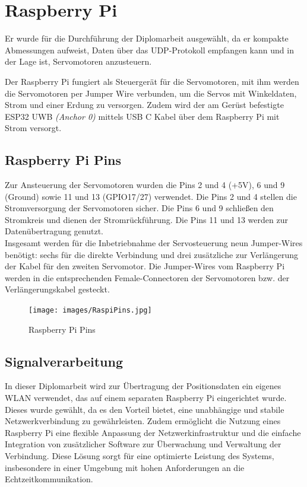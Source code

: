 \section{Raspberry Pi}
Er wurde für die Durchführung der Diplomarbeit ausgewählt, da er kompakte Abmessungen aufweist, Daten über das UDP-Protokoll empfangen kann und in der Lage ist, Servomotoren anzusteuern.

Der Raspberry Pi fungiert als Steuergerät für die Servomotoren, mit ihm werden die Servomotoren per Jumper Wire verbunden, um die Servos mit Winkeldaten, Strom und einer Erdung zu versorgen. Zudem wird der am Gerüst befestigte ESP32 UWB \textit{(Anchor 0)} mittels USB C Kabel über dem Raspberry Pi mit Strom versorgt. 

\newpage
\subsection{Raspberry Pi Pins}
Zur Ansteuerung der Servomotoren wurden die Pins 2 und 4 (+5V), 6 und 9 (Ground) sowie 11 und 13 (GPIO17/27) verwendet. Die Pins 2 und 4 stellen die Stromversorgung der Servomotoren sicher. Die Pins 6 und 9 schließen den Stromkreis und dienen der Stromrückführung. Die Pins 11 und 13 werden zur Datenübertragung genutzt.\\
Insgesamt werden für die Inbetriebnahme der Servosteuerung neun Jumper-Wires benötigt: sechs für die direkte Verbindung und drei zusätzliche zur Verlängerung der Kabel für den zweiten Servomotor. Die Jumper-Wires vom Raspberry Pi werden in die entsprechenden Female-Connectoren der Servomotoren bzw. der Verlängerungskabel gesteckt.

\begin{figure}[H]
	\centering
	\texttt{[image: images/RaspiPins.jpg]}
	\caption[Raspberry Pi Pins]{Raspberry Pi Pins}
	\label{fig: Raspberry Pi Pins}
\end{figure}


\subsection{Signalverarbeitung}
In dieser Diplomarbeit wird zur Übertragung der Positionsdaten ein eigenes WLAN verwendet, das auf einem separaten Raspberry Pi eingerichtet wurde. Dieses wurde gewählt, da es den Vorteil bietet, eine unabhängige und stabile Netzwerkverbindung zu gewährleisten. Zudem ermöglicht die Nutzung eines Raspberry Pi eine flexible Anpassung der Netzwerkinfrastruktur und die einfache Integration von zusätzlicher Software zur Überwachung und Verwaltung der Verbindung. Diese Lösung sorgt für eine optimierte Leistung des Systems, insbesondere in einer Umgebung mit hohen Anforderungen an die Echtzeitkommunikation.

